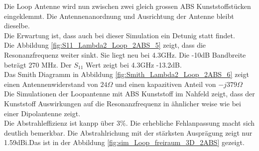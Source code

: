 Die Loop Antenne wird nun zwischen zwei gleich grossen ABS Kunststoffstücken eingeklemmt. Die Antennenanordnung und Ausrichtung der Antenne bleibt dieselbe. \\
Die Erwartung ist, dass auch bei dieser Simulation ein Detunig statt findet.\\ 

Die Abbildung \ref{fig:S11_Lambda2_Loop_2ABS_5} zeigt, dass die Resonanzfrequenz weiter sinkt. Sie liegt neu bei 4.3GHz. Die -10dB Bandbreite beträgt 270 MHz. Der $S_{11}$ Wert zeigt bei 4.3GHz -13.2dB.\\
Das Smith Diagramm in Abbildung \ref{fig:Smith_Lambda2_Loop_2ABS_6} zeigt einen Antennenwiderstand von $24\Omega$ und einen kapazitiven Anteil von $-j379\Omega$\\
Die Simulationen der Loopantenne mit ABS Kunststoff im Nahfeld  zeigt, dass der Kunststoff  Auswirkungen auf die Resonanzfrequenz in ähnlicher weise wie bei einer Dipolantenne zeigt.\\
Die Abstrahleffizienz ist kanpp über $3\%$. Die erhebliche Fehlanpassung macht sich deutlich bemerkbar. Die Abstrahlrichung mit der stärksten Ausprägung zeigt nur 1.59dBi.Das ist in der Abbildung \ref{fig:sim_Loop_freiraum_3D_2ABS} gezeigt.
